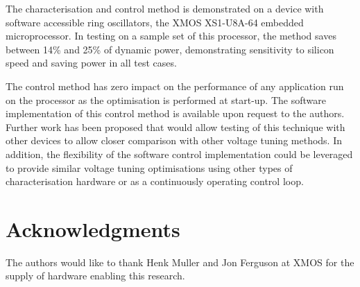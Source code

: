 \documentclass[a4paper,twocolumn,DIV=16]{scrartcl}
\begin{document}
The characterisation and control method is demonstrated on a device with
software accessible ring oscillators, the XMOS XS1-U8A-64 embedded
microprocessor. In testing on a sample set of this processor, the method saves
between 14\% and 25\% of dynamic power, demonstrating sensitivity to silicon
speed and saving power in all test cases. 

The control method has zero impact on the performance of any application run
on the processor as the optimisation is performed at start-up. The software
implementation of this control method is available upon request to the
authors. Further work has been proposed that would allow testing of this
technique with other devices to allow closer comparison with other voltage
tuning methods. In addition, the flexibility of the software control
implementation could be leveraged to provide similar voltage tuning
optimisations using other types of characterisation hardware or as a
continuously operating control loop.

\section*{Acknowledgments}

The authors would like to thank Henk Muller and Jon Ferguson at XMOS for the
supply of hardware enabling this research.




\end{document}
